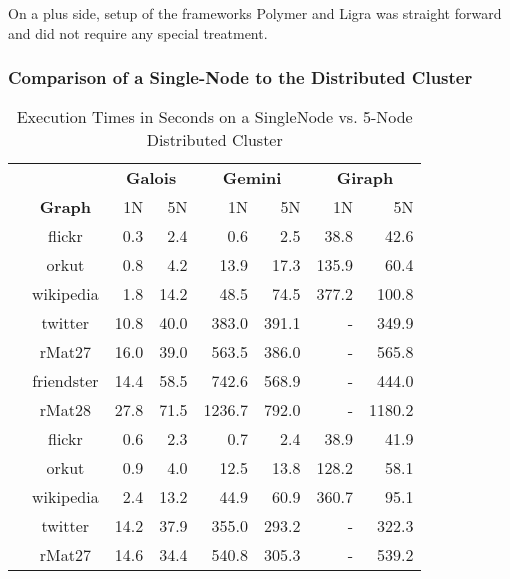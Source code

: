 On a plus side, setup of the frameworks Polymer and Ligra was straight forward and did not require any special treatment.











\subsubsection{Comparison of a Single-Node to the Distributed Cluster}
\begin{table}
	\caption{Execution Times in Seconds on a SingleNode vs. 5-Node Distributed Cluster}
	\label{tbl:execTimeComparison}
	\renewcommand{\arraystretch}{1.2}
	\centering
	\begin{tabular}{ccr@{\tabskip 1 \tabcolsep}r
	r@{\tabskip 1 \tabcolsep}r
	r@{\tabskip 1 \tabcolsep}r}
		\toprule
		&&\multicolumn{2}{c}{\bf Galois}&\multicolumn{2}{c}{\bf Gemini}&\multicolumn{2}{c}{\bf Giraph}\\
		\cmidrule{3-4}\cmidrule{5-6}\cmidrule{7-8}
		&\bf Graph&1N&5N&1N&5N&1N&5N\\
		\midrule
		\multirow{7}{0.5ex}{\rotatebox{90}{\bf SSSP}}&flickr & 0.3 & 2.4 & 0.6 & 2.5 & 38.8 & 42.6 \\
		& orkut & 0.8 & 4.2 & 13.9 & 17.3 & 135.9 & 60.4 \\
		& wikipedia & 1.8 & 14.2 & 48.5 & 74.5 & 377.2 & 100.8 \\
		& twitter & 10.8 & 40.0 & 383.0 & 391.1 & - & 349.9 \\
		& rMat27 & 16.0 & 39.0 & 563.5 & 386.0 & - & 565.8 \\
		& friendster & 14.4 & 58.5 & 742.6 & 568.9 & - & 444.0 \\
		& rMat28 & 27.8 & 71.5 & 1236.7 & 792.0 & - & 1180.2 \\
		\midrule
		\multirow{7}{0.5ex}{\rotatebox{90}{\bf BFS}}& flickr & 0.6 & 2.3 & 0.7 & 2.4 & 38.9 & 41.9 \\
		& orkut & 0.9 & 4.0 & 12.5 & 13.8 & 128.2 & 58.1 \\
		& wikipedia & 2.4 & 13.2 & 44.9 & 60.9 & 360.7 & 95.1 \\
		& twitter & 14.2 & 37.9 & 355.0 & 293.2 & - & 322.3 \\
		& rMat27 & 14.6 & 34.4 & 540.8 & 305.3 & - & 539.2 \\

\end{tabular}
\end{table}
